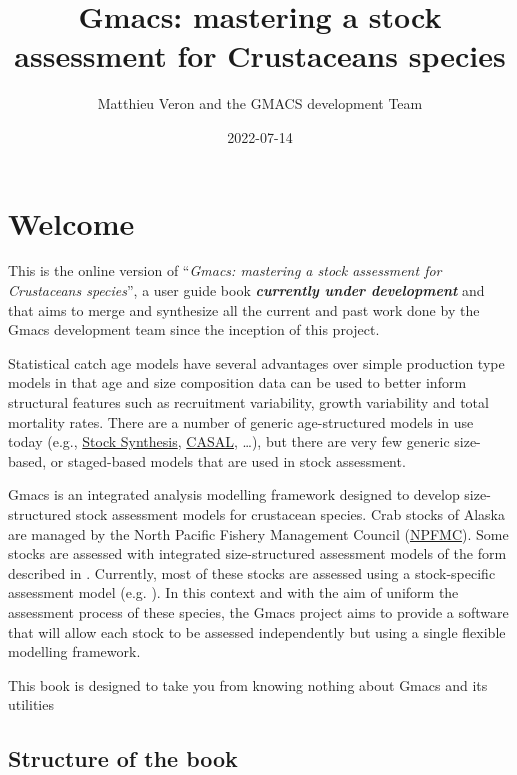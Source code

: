 \documentclass[
]{book}
\title{Gmacs: mastering a stock assessment for Crustaceans species}
\author{Matthieu Veron and the GMACS development Team}
\date{2022-07-14}
\begin{document}
\maketitle

{
\hypersetup{linkcolor=}
\setcounter{tocdepth}{1}
\tableofcontents
}
\hypertarget{welcome}{%
\chapter*{Welcome}\label{welcome}}

This is the online version of ``\emph{Gmacs: mastering a stock assessment for Crustaceans species}'',
a user guide book \textbf{\emph{currently under development}} and that aims to merge
and synthesize all the current and past work done by the Gmacs development team
since the inception of this project.

Statistical catch age models have several advantages over simple production
type models in that age and size composition data can be used to better inform
structural features such as recruitment variability, growth variability and
total mortality rates. There are a number of generic age-structured models in use
today (e.g., \href{https://vlab.noaa.gov/web/stock-synthesis}{Stock Synthesis},
\href{https://niwa.co.nz/fisheries/tools-resources/casal}{CASAL}, \ldots), but there are
very few generic size-based, or staged-based models that are used in stock assessment.

Gmacs is an integrated analysis modelling framework designed to develop size-structured
stock assessment models for crustacean species. Crab stocks of Alaska are managed
by the North Pacific Fishery Management Council (\href{http://npfmc.org}{NPFMC}). Some
stocks are assessed with integrated size-structured assessment models of the
form described in \citet{punt_review_2013}. Currently, most of these stocks are assessed using a stock-specific assessment model (e.g. \citet{zheng_bristol_2014}). In this context and with the aim of uniform the assessment process of these species, the Gmacs project aims to provide a software that will allow each stock to be assessed independently but using a single flexible modelling framework.

This book is designed to take you from knowing nothing about Gmacs and its utilities

\hypertarget{structure-of-the-book}{%
\section*{Structure of the book}\label{structure-of-the-book}}
\end{document}
